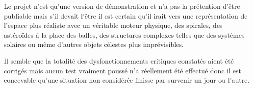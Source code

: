 \documentclass{article}
\begin{document}
Le projet n’est qu’une version de démonstration et n’a pas la prétention d’être publiable mais s’il devait l’être il est certain qu’il irait vers une représentation de l’espace plus réaliste avec un véritable moteur physique, des spirales, des astéroïdes à la place des balles, des structures complexes telles que des systèmes solaires ou même d’autres objets célestes plus imprévisibles.

Il semble que la totalité des dysfonctionnements critiques constatés aient été corrigés mais aucun test vraiment poussé n’a réellement été effectué donc il est concevable qu’une situation non considérée finisse par survenir un jour ou l'autre.



\end{document}
